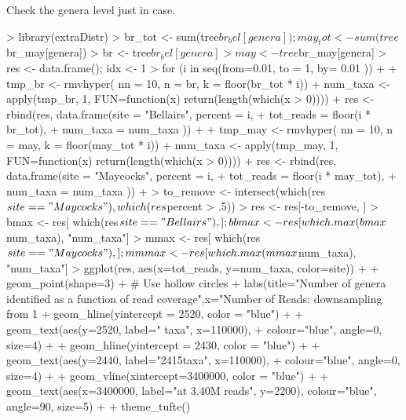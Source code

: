 \documentclass{article}
\begin{document}
Check the genera level just in case.
\begin{Schunk}
\begin{Sinput}
> library(extraDistr)
> br_tot <- sum(tree$br_bel[genera]); may_tot <-  sum(tree$br_may[genera])
> br <- tree$br_bel[genera]
> may <- tree$br_may[genera]
> res <- data.frame(); idx <- 1
> for (i in seq(from=0.01, to = 1, by= 0.01 )) {
+   
+   tmp_br <- rmvhyper( nn = 10, n = br,   k = floor(br_tot * i))
+   num_taxa <- apply(tmp_br, 1, FUN=function(x) {return(length(which(x > 0)))})
+   res <- rbind(res,  data.frame(site = "Bellairs", percent = i, 
+                             tot_reads = floor(i * br_tot),
+                             num_taxa  = num_taxa ))
+   
+   tmp_may <- rmvhyper( nn = 10, n = may,   k = floor(may_tot * i))
+   num_taxa <- apply(tmp_may, 1, FUN=function(x) {return(length(which(x > 0)))})
+   res <- rbind(res,  data.frame(site = "Maycocks", percent = i, 
+                           tot_reads = floor(i * may_tot),
+                           num_taxa  = num_taxa ))
+ }
> to_remove <- intersect(which(res$site == "Maycocks"), which(res$percent  > .5))
> res <- res[-to_remove, ]
> bmax <- res[ which(res$site == "Bellairs"), ]; bbmax <- res[which.max(bmax$num_taxa), "num_taxa"]
> mmax <- res[ which(res$site == "Maycocks"), ]; mmmax <- res[which.max(mmax$num_taxa), "num_taxa"]
> ggplot(res, aes(x=tot_reads, y=num_taxa, color=site)) +
+   geom_point(shape=3) +    # Use hollow circles
+   labs(title="Number of genera identified as a function of read coverage",x="Number of Reads: downsampling from 1% to 50% of data", y = "Number of Genera")+
+   geom_hline(yintercept = 2520, color = "blue") +
+   geom_text(aes(y=2520, label=" taxa", x=110000), 
+             colour="blue", angle=0, size=4) +
+   geom_hline(yintercept = 2430, color = "blue") +
+   geom_text(aes(y=2440, label="\n2415taxa", x=110000), 
+             colour="blue", angle=0, size=4) +
+   geom_vline(xintercept=3400000, color = "blue") +
+   geom_text(aes(x=3400000, label="\ntruncated at 3.40M reads", y=2200), colour="blue", angle=90, size=5) +
+   theme_tufte()
\end{Sinput}
\end{Schunk}
\end{document}
